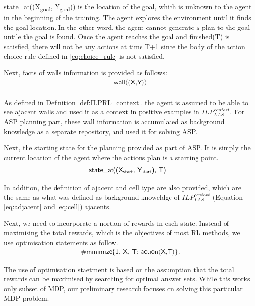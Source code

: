 \textsf{state\_at((X\textsubscript{goal}, Y\textsubscript{goal}))} is the location of the goal, which is unknown to the agent in the beginning of the training.
The agent explores the environment until it finds the goal location.
In the other word, the agent cannot generate a plan to the goal untile the goal is found. 
Once the agent reaches the goal and \textsf{finished(T)} is satisfied, 
there will not be any actions at time T+1 since the body of the action choice rule defined in \ref{eq:choice_rule} is not satisfied.

Next, facts of walls information is provided as follows:
\begin{equation}
\begin{split}
&\textsf{wall((X,Y))}\\
\end{split}
\end{equation}

As defined in Definition \ref{def:ILPRL_context}, the agent is assumed to be able to see ajacent walls and used it as a context in positive examples in $ILP_{LAS}^{context}$. 
For ASP planning part, these wall information is accumulated as background knowledge as a separate repository, and used it for solving ASP. 

Next, the starting state for the planning provided as part of ASP. It is simply the current location of the agent where the actions plan is a starting point.
\begin{equation}
\begin{split}
\textsf{state\_at((X\textsubscript{start}, Y\textsubscript{start}), T)}
\end{split}
\end{equation}

In addition, the definition of ajacent and cell type are also provided, which are the same as what was defined as background knoweldge of $ILP_{LAS}^{context}$ (Equation \ref{eq:adjacent} and \ref{eq:cell})
ajacents.

Next, we need to incorporate a nortion of rewards in each state. Instead of maximising the total rewards, which is the objectives of most RL methods, 
we use optimisation statements as follow. 
\begin{equation}
\begin{split}
&\textsf{\#minimize\{1, X, T: action(X,T)\}}.
\end{split}
\end{equation}

The use of optimisation staetment is based on the assumption that the total rewards can be maximised by searching for optimal answer sets. 
While this works only subset of MDP, our preliminary research focuses on solving this particular MDP problem. 
    
